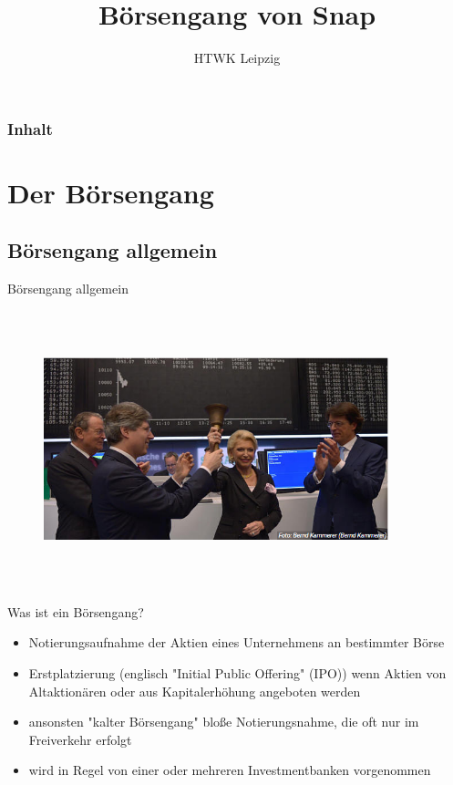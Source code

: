 \documentclass{beamer}
\title{Börsengang von Snap}
\institute{Alex Dudin, Hendrik Schick, Andre Hildebrandt}
\author[]{HTWK Leipzig} %
\begin{document}
\begin{frame}
\titlepage
\end{frame}

\begin{frame}
\frametitle{Inhalt}
\tableofcontents
\end{frame}


\section{Der Börsengang}


\subsection{Börsengang allgemein}

\begin{frame} {Börsengang allgemein}
\begin{figure}
	\centering
	\includegraphics[width=10cm, height=8cm]{boersenglockeeinfuehrung.PNG}
\end{figure}
\end{frame}

\begin{frame} {Was ist ein Börsengang?}
\begin{itemize}
\item Notierungsaufnahme der Aktien eines Unternehmens an bestimmter Börse 
\item Erstplatzierung (englisch "Initial Public Offering" (IPO)) wenn Aktien von Altaktionären oder aus Kapitalerhöhung angeboten werden
\item ansonsten "kalter Börsengang" bloße Notierungsnahme, die oft nur im Freiverkehr erfolgt
\item wird in Regel von einer oder mehreren Investmentbanken vorgenommen
\end{itemize}
\end{frame}
\end{document}

